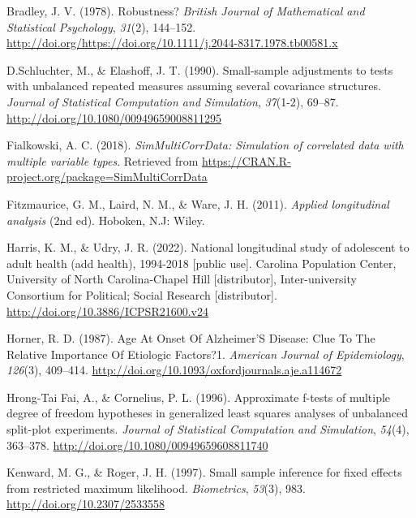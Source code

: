 \documentclass[12pt, twoside]{amherstthesis}
\begin{document}
\leavevmode\hypertarget{ref-bradley}{}%
Bradley, J. V. (1978). Robustness? \emph{British Journal of Mathematical and Statistical Psychology}, \emph{31}(2), 144--152. \url{http://doi.org/https://doi.org/10.1111/j.2044-8317.1978.tb00581.x}

\leavevmode\hypertarget{ref-Schluchte}{}%
D.Schluchter, M., \& Elashoff, J. T. (1990). Small-sample adjustments to tests with unbalanced repeated measures assuming several covariance structures. \emph{Journal of Statistical Computation and Simulation}, \emph{37}(1-2), 69--87. \url{http://doi.org/10.1080/00949659008811295}

\leavevmode\hypertarget{ref-Simtest}{}%
Fialkowski, A. C. (2018). \emph{SimMultiCorrData: Simulation of correlated data with multiple variable types}. Retrieved from \url{https://CRAN.R-project.org/package=SimMultiCorrData}

\leavevmode\hypertarget{ref-fitzmaurice_applied_2011}{}%
Fitzmaurice, G. M., Laird, N. M., \& Ware, J. H. (2011). \emph{Applied longitudinal analysis} (2nd ed). Hoboken, N.J: Wiley.

\leavevmode\hypertarget{ref-harris_national_2022}{}%
Harris, K. M., \& Udry, J. R. (2022). National longitudinal study of adolescent to adult health (add health), 1994-2018 {[}public use{]}. Carolina Population Center, University of North Carolina-Chapel Hill {[}distributor{]}, Inter-university Consortium for Political; Social Research {[}distributor{]}. \url{http://doi.org/10.3886/ICPSR21600.v24}

\leavevmode\hypertarget{ref-horner_age_1987}{}%
Horner, R. D. (1987). Age At Onset Of Alzheimer'S Disease: Clue To The Relative Importance Of Etiologic Factors?1. \emph{American Journal of Epidemiology}, \emph{126}(3), 409--414. \url{http://doi.org/10.1093/oxfordjournals.aje.a114672}

\leavevmode\hypertarget{ref-hrong-tai_fai_approximate_1996}{}%
Hrong-Tai Fai, A., \& Cornelius, P. L. (1996). Approximate f-tests of multiple degree of freedom hypotheses in generalized least squares analyses of unbalanced split-plot experiments. \emph{Journal of Statistical Computation and Simulation}, \emph{54}(4), 363--378. \url{http://doi.org/10.1080/00949659608811740}

\leavevmode\hypertarget{ref-kenward_small_1997}{}%
Kenward, M. G., \& Roger, J. H. (1997). Small sample inference for fixed effects from restricted maximum likelihood. \emph{Biometrics}, \emph{53}(3), 983. \url{http://doi.org/10.2307/2533558}
\end{document}
